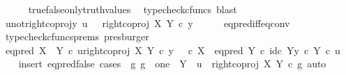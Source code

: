\begin{isabellebody}
\ \ \ \ \isamarkupfalse%
\ true{\isacharunderscore}{\kern0pt}false{\isacharunderscore}{\kern0pt}only{\isacharunderscore}{\kern0pt}truth{\isacharunderscore}{\kern0pt}values\ \isamarkupfalse%
\ {\isacharparenleft}{\kern0pt}typecheck{\isacharunderscore}{\kern0pt}cfuncs{\isacharcomma}{\kern0pt}\ blast{\isacharparenright}{\kern0pt}\isanewline
\ \ \isamarkupfalse%
\ \isamarkupfalse%
\ u{\isacharunderscore}{\kern0pt}not{\isacharunderscore}{\kern0pt}right{\isacharunderscore}{\kern0pt}coproj{\isacharunderscore}{\kern0pt}y{\isacharcolon}{\kern0pt}\ {\isachardoublequoteopen}u\ \ {\isasymnoteq}\ right{\isacharunderscore}{\kern0pt}coproj\ X\ Y\ {\isasymcirc}\isactrlsub c\ y{\isachardoublequoteclose}\isanewline
\ \ \ \ \isamarkupfalse%
\ eq{\isacharunderscore}{\kern0pt}pred{\isacharunderscore}{\kern0pt}iff{\isacharunderscore}{\kern0pt}eq{\isacharunderscore}{\kern0pt}conv\ \isamarkupfalse%
\ {\isacharparenleft}{\kern0pt}typecheck{\isacharunderscore}{\kern0pt}cfuncs{\isacharunderscore}{\kern0pt}prems{\isacharcomma}{\kern0pt}\ presburger{\isacharparenright}{\kern0pt}\isanewline
\isanewline
\ \ \isamarkupfalse%
\ {\isachardoublequoteopen}eq{\isacharunderscore}{\kern0pt}pred\ {\isacharparenleft}{\kern0pt}X\ {\isasymCoprod}\ Y{\isacharparenright}{\kern0pt}\ {\isasymcirc}\isactrlsub c\ {\isasymlangle}u{\isacharcomma}{\kern0pt}right{\isacharunderscore}{\kern0pt}coproj\ X\ Y\ {\isasymcirc}\isactrlsub c\ y{\isasymrangle}\ {\isacharequal}{\kern0pt}\ {\isacharparenleft}{\kern0pt}{\isasymf}\ {\isasymcirc}\isactrlsub c\ {\isasymbeta}\isactrlbsub X\isactrlesub {\isacharparenright}{\kern0pt}\ {\isasymamalg}\ {\isacharparenleft}{\kern0pt}eq{\isacharunderscore}{\kern0pt}pred\ Y\ {\isasymcirc}\isactrlsub c\ {\isasymlangle}id\isactrlsub c\ Y{\isacharcomma}{\kern0pt}y\ {\isasymcirc}\isactrlsub c\ {\isasymbeta}\isactrlbsub Y\isactrlesub {\isasymrangle}{\isacharparenright}{\kern0pt}\ {\isasymcirc}\isactrlsub c\ u{\isachardoublequoteclose}\isanewline
\ \ \isamarkupfalse%
\ {\isacharparenleft}{\kern0pt}insert\ eq{\isacharunderscore}{\kern0pt}pred{\isacharunderscore}{\kern0pt}false{\isacharcomma}{\kern0pt}\ cases\ {\isachardoublequoteopen}{\isasymexists}\ g{\isachardot}{\kern0pt}\ g\ {\isacharcolon}{\kern0pt}\ one\ {\isasymrightarrow}\ Y\ {\isasymand}\ u\ {\isacharequal}{\kern0pt}\ right{\isacharunderscore}{\kern0pt}coproj\ X\ Y\ {\isasymcirc}\isactrlsub c\ g{\isachardoublequoteclose}{\isacharcomma}{\kern0pt}\ auto{\isacharparenright}{\kern0pt}\isanewline
\ \ \ \ \isamarkupfalse%

\end{isabellebody}
